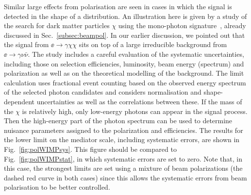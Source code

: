 Similar large effects from polarisation are seen in cases in which the signal is detected in 
the shape of  a  distribution.    An illustration here is given by a study of the search for 
dark matter particles $\chi$ using the mono-photon signature~\cite{Habermehl:417605}, already discussed in Sec.~\ref{subsec:beampol}.   In our earlier discussion, we pointed out that the signal from 
$\ee\to \gamma \chi\chi$ sits on top of a large irreducible background from 
$\ee\to \gamma \nu\bar \nu $.  The study includes a careful evaluation of the systematic uncertainties, including those on selection efficiencies, luminosity, beam energy (spectrum) and polarization as well as on the theoretical modelling of the background. 
The limit calculation uses fractional event counting based on the observed energy spectrum of the selected photon candidates and considers normalisation and shape-dependent uncertainties as well as the correlations between these. If the mass of the $\chi$ is relatively high, only low-energy photons can appear in the signal process.  Then the high-energy part of the photon spectrum can be used to determine nuisance parameters assigned to the 
polarization and efficiencies.  The results for the lower limit on the mediator scale, including 
systematic errors, are shown in Fig.~\ref{fig:polWIMPsys}. This figure should be compared to 
Fig.~\ref{fig:polWIMPstat}, in which systematic errors are set to zero.   Note that, in this case, the strongest limits are set using a mixture of beam polarizations (the dashed red curve in both cases) since this allows the systematic errors from beam polarisation to be better 
controlled.







